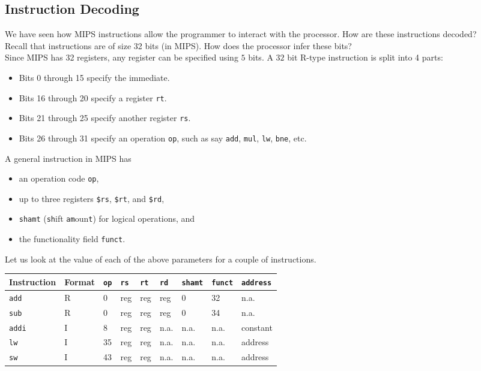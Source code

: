 \documentclass{article}
\begin{document}
	\subsection{Instruction Decoding}

		We have seen how MIPS instructions allow the programmer to interact with the processor. How are these instructions decoded?\\
		Recall that instructions are of size 32 bits (in MIPS). How does the processor infer these bits?\\
		Since MIPS has 32 registers, any register can be specified using $5$ bits. A $32$ bit R-type instruction is split into 4 parts:
		\begin{itemize}
			\item Bits 0 through 15 specify the immediate.
			\item Bits 16 through 20 specify a register \texttt{rt}.
			\item Bits 21 through 25 specify another register \texttt{rs}.
			\item Bits 26 through 31 specify an operation \texttt{op}, such as say \texttt{add}, \texttt{mul}, \texttt{lw}, \texttt{bne}, etc.
		\end{itemize}
		A general instruction in MIPS has
		\begin{itemize}
			\item an operation code \texttt{op},
			\item up to three registers \texttt{\$rs}, \texttt{\$rt}, and \texttt{\$rd},
			\item \texttt{shamt} (\texttt{sh}ift \texttt{am}oun\texttt{t}) for logical operations, and
			\item the functionality field \texttt{funct}.
		\end{itemize}
		Let us look at the value of each of the above parameters for a couple of instructions.
		\begin{center}
		\begin{tabular}{|l|l|l|l|l|l|l|l|l|}
			\hline
			Instruction & Format & \texttt{op} & \texttt{rs} & \texttt{rt} & \texttt{rd} & \texttt{shamt} & \texttt{funct} & \texttt{address} \\ \hline
			\texttt{add} & R & 0 & reg & reg & reg & 0 & 32 & n.a. \\
			\texttt{sub} & R & 0 & reg & reg & reg & 0 & 34 & n.a. \\
			\texttt{addi} & I & 8 & reg & reg & n.a. & n.a. & n.a. & constant \\
			\texttt{lw} & I & 35 & reg & reg & n.a. & n.a. & n.a. & address \\
			\texttt{sw} & I & 43 & reg & reg & n.a. & n.a. & n.a. & address \\ \hline
		\end{tabular}
		\end{center}
\end{document}
